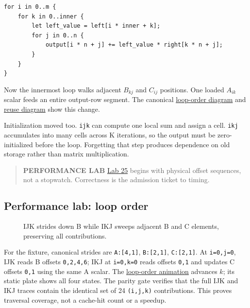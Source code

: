 \documentclass[
  10pt,
]{article}
\begin{document}
\begin{verbatim}
for i in 0..m {
    for k in 0..inner {
        let left_value = left[i * inner + k];
        for j in 0..n {
            output[i * n + j] += left_value * right[k * n + j];
        }
    }
}
\end{verbatim}

Now the innermost loop walks adjacent \(B_{kj}\) and \(C_{ij}\)
positions. One loaded \(A_{ik}\) scalar feeds an entire output-row
segment. The canonical
\href{https://github.com/hermonai/inside-the-llm-engine/blob/astra-visual-rewrite/diagrams/linear/loop-order-ijk-vs-ikj.txt}{loop-order
diagram} and
\href{https://github.com/hermonai/inside-the-llm-engine/blob/astra-visual-rewrite/diagrams/linear/follow-the-reuse.txt}{reuse
diagram} show this change.

Initialization moved too. \texttt{ijk} can compute one local sum and
assign a cell. \texttt{ikj} accumulates into many cells across K
iterations, so the output must be zero-initialized before the loop.
Forgetting that step produces dependence on old storage rather than
matrix multiplication.

\begin{quote}
\textbf{PERFORMANCE LAB}
\href{https://github.com/hermonai/inside-the-llm-engine/blob/astra-visual-rewrite/labs/lab-25-loop-order.md}{Lab
25} begins with physical offset sequences, not a stopwatch. Correctness
is the admission ticket to timing.
\end{quote}

\subsection{Performance lab: loop
order}\label{performance-lab-loop-order}

\begin{figure}[H]\centering\resizebox{\linewidth}{!}{}\caption{IJK strides down B while IKJ sweeps adjacent B and C elements, preserving all contributions.}\end{figure}

For the fixture, canonical strides are \texttt{A:{[}4,1{]}},
\texttt{B:{[}2,1{]}}, \texttt{C:{[}2,1{]}}. At \texttt{i=0,j=0}, IJK
reads B offsets \texttt{0,2,4,6}; IKJ at \texttt{i=0,k=0} reads offsets
\texttt{0,1} and updates C offsets \texttt{0,1} using the same A scalar.
The
\href{https://github.com/hermonai/inside-the-llm-engine/blob/astra-visual-rewrite/figures/generated/ch06-loops.html}{loop-order
animation} advances \(k\); its static plate shows all four states. The
parity gate verifies that the full IJK and IKJ traces contain the
identical set of 24 \texttt{(i,j,k)} contributions. This proves
traversal coverage, not a cache-hit count or a speedup.
\end{document}
